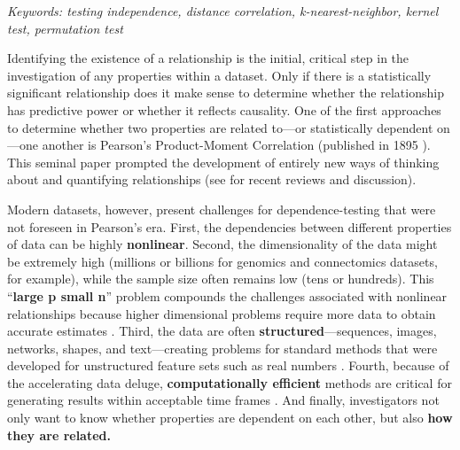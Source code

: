 \documentclass[11pt]{article}
\begin{document}
\noindent%
{\it Keywords: testing independence, distance correlation, k-nearest-neighbor, kernel test, permutation test}

\clearpage
\setcounter{tocdepth}{2}

Identifying the existence of a relationship is the initial, critical step in the investigation of any properties within a dataset. Only if there is a statistically significant relationship does it make sense to determine whether the relationship has predictive power or whether it reflects causality.
One of the first approaches to determine whether two properties are related to---or statistically dependent on---one another is Pearson's Product-Moment Correlation (published in 1895 \cite{Pearson1895}). This seminal paper prompted the development of  entirely new ways of thinking about and quantifying relationships (see \cite{Reimherr2013,JosseHolmes2013} for  recent reviews and discussion).


Modern datasets, however, present  challenges for dependence-testing that were not foreseen in Pearson's era.
%
First, the dependencies between different properties 
of data can be highly \textbf{nonlinear}.
% 
Second, the dimensionality of the data might be extremely high (millions or billions for genomics and connectomics datasets, for example), while the sample size often remains low (tens or hundreds).  This ``\textbf{large p small n}'' problem compounds the challenges associated with nonlinear relationships because higher dimensional problems require more data to obtain accurate estimates \cite{johnstone2009statistical}.
% 
Third, the data are often \textbf{structured}---sequences, images, networks, shapes, and text---creating problems for standard methods that were developed for unstructured feature sets such as real numbers \cite{bakir2007predicting}.
% 
Fourth, because of the accelerating data deluge,  \textbf{computationally efficient} methods are critical for generating results within acceptable time frames \cite{hey2009fourth}.
%
And finally, investigators not only want to know {whether}  properties are dependent on each other, but also \textbf{how they are related.}
\end{document}
